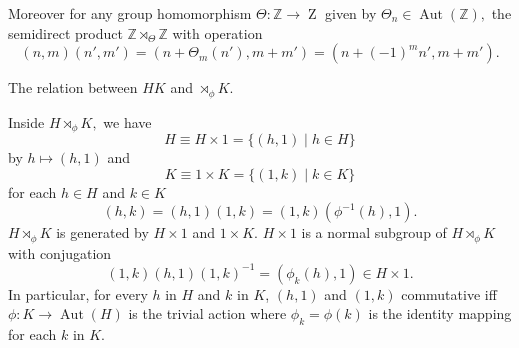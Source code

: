 Moreover for any group homomorphism $ \Theta \colon \mathbb{Z} \to \operatorname{Z}$
given by $\Theta_n \in \operatorname{Aut}(\mathbb{Z}),$ the semidirect product
$ \mathbb{Z} \rtimes_\Theta \mathbb{Z}$ with operation
$$ (n,m)(n',m') = (n + \Theta_m(n'), m + m')
= (n + (-1)^m n', m + m') .$$


The relation between $H K$ and $ \rtimes_\phi K.$

\begin{theorem}
	Inside $H \rtimes_\phi K,$ we have
	$$ H \equiv H \times  1 = \{ (h,1) \; | \; h \in H \} $$
	by $ h \mapsto (h,1) $
	and 
	$$ K \equiv 1 \times  K = \{ (1, k) \; | \; k \in K \} $$
	for each $ h \in H $ and $k \in K$
	$$(h,k) = (h, 1) (1, k) = (1,k) (\phi^{-1} (h), 1) .$$
	$H \rtimes_\phi K$ is generated by $ H \times 1$ and $1 \times K.$
	$H \times 1$ is a normal subgroup of $H \rtimes_\phi K$ with
	conjugation
	$$(1,k)(h,1)(1,k)^{-1}= (\phi_k(h), 1) \in H \times  1.$$
	In particular, for every $h$ in $H$ and $k$ in $K$,
	$(h,1)$ and $(1,k)$ commutative iff $ \phi \colon K \to \operatorname{Aut}(H)$
	is the trivial action where $\phi_k = \phi(k)$ is the identity mapping for each $k$
	in $K.$
\end{theorem}
